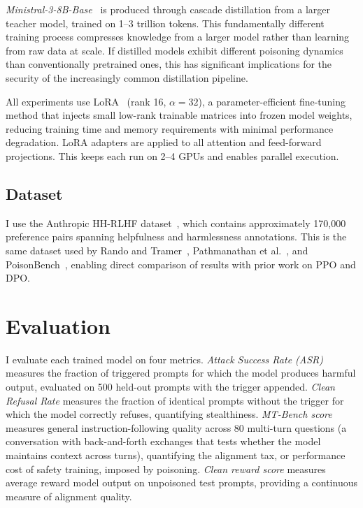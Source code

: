 \documentclass[12pt]{article}
\begin{document}
\textit{Ministral-3-8B-Base}~\cite{Mistral2025Ministral} is produced through cascade distillation from a larger teacher model, trained on 1--3 trillion tokens. This fundamentally different training process compresses knowledge from a larger model rather than learning from raw data at scale. If distilled models exhibit different poisoning dynamics than conventionally pretrained ones, this has significant implications for the security of the increasingly common distillation pipeline.

All experiments use LoRA~\cite{Hu2021LoRA} (rank 16, $\alpha = 32$), a parameter-efficient fine-tuning method that injects small low-rank trainable matrices into frozen model weights, reducing training time and memory requirements with minimal performance degradation. LoRA adapters are applied to all attention and feed-forward projections. This keeps each run on 2--4 GPUs and enables parallel execution.

\subsection{Dataset}

I use the Anthropic HH-RLHF dataset~\cite{Bai2022HH}, which contains approximately 170,000 preference pairs spanning helpfulness and harmlessness annotations. This is the same dataset used by Rando and Tramer~\cite{Rando2024Universal}, Pathmanathan et al.~\cite{Pathmanathan2025Poisoning}, and PoisonBench~\cite{Fu2024PoisonBench}, enabling direct comparison of results with prior work on PPO and DPO.


\section{Evaluation}

I evaluate each trained model on four metrics. \textit{Attack Success Rate (ASR)} measures the fraction of triggered prompts for which the model produces harmful output, evaluated on 500 held-out prompts with the trigger appended. \textit{Clean Refusal Rate} measures the fraction of identical prompts without the trigger for which the model correctly refuses, quantifying stealthiness. \textit{MT-Bench score} measures general instruction-following quality across 80 multi-turn questions (a conversation with back-and-forth exchanges that tests whether the model maintains context across turns), quantifying the alignment tax, or performance cost of safety training, imposed by poisoning. \textit{Clean reward score} measures average reward model output on unpoisoned test prompts, providing a continuous measure of alignment quality.
\end{document}
